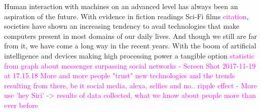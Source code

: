 
Human interaction with machines on an advanced level has always been an aspiration of the future. With evidence in fiction readings Sci-Fi films \textcolor{magenta}{citation}, societies have shown an increasing tendency to avail technologies that make computers present in most domains of our daily lives. And though we still are far from it, we have come a long way in the recent years. With the boom of artificial intelligence and devices making high processing power a tangible option \textcolor{magenta}{statistic from graph about messenger surpassing social networks - Screen Shot 2017-11-19 at 17.15.18}
\textcolor{magenta}{More and more people "trust" new technologies and the trends resulting from there, be it social media, alexa, selfies and no.. ripple effect - More use 'hey Siri' -> results of data collected, what we know about people more than ever before}

